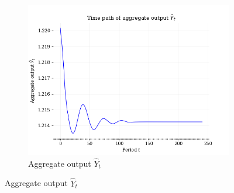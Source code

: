 \documentclass[letterpaper,12pt]{article}
\theoremstyle{definition}
\begin{document}
\begin{figure}[htbp]
      \begin{subfigure}[b]{0.4\textwidth}
        \includegraphics[width=\textwidth]{images/TP_Y_path.png}
        \caption{Aggregate output $\hat{Y}_t$}
        \label{FigTP_KLY_Y}
      \end{subfigure}
    \end{figure}
\end{document}
